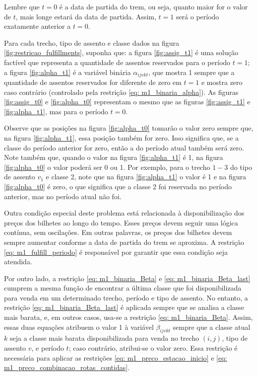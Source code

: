 Lembre que $t=0$ é a data de partida do trem, ou seja, quanto maior for o valor de $t$, mais longe estará da data de partida. Assim, $t=1$ será o período exatamente anterior a $t=0$.

Para cada trecho, tipo de assento e classe dados na figura \ref{fig:restricao_fulfillments}, suponha que: a figura \ref{fig:assig_t1} é uma solução factível que representa a quantidade de assentos reservados para o período $t=1$; a figura \ref{fig:alpha_t1}  é a variável binária $\alpha_{ijvkt}$, que mostra 1 sempre que a quantidade de assentos reservados for diferente de zero em $t=1$ e mostra zero caso contrário (controlado pela restrição \ref{eq: m1_binaria_alpha}). As figuras \ref{fig:assig_t0} e \ref{fig:alpha_t0} representam o mesmo que as figuras \ref{fig:assig_t1} e \ref{fig:alpha_t1}, mas para o período $t=0$.

Observe que as posições na figura \ref{fig:alpha_t0} tomarão o valor zero sempre que, na figura \ref{fig:alpha_t1}, essa posição também for zero. Isso significa que, se a classe do período anterior for zero, então a do período atual também será zero. Note também que, quando o valor na figura \ref{fig:alpha_t1} é 1, na figura \ref{fig:alpha_t0} o valor poderá ser 0 ou 1. Por exemplo, para o trecho $1-3$ do tipo de assento $v_1$ e classe 2, note que na figura \ref{fig:alpha_t1} o valor é 1 e na figura \ref{fig:alpha_t0} é zero, o que significa que a classe 2 foi reservada no período anterior, mas no período atual não foi.


Outra condição especial deste problema está relacionada à disponibilização dos preços dos bilhetes ao longo do tempo. Esses preços devem seguir uma lógica contínua, sem oscilações. Em outras palavras, os preços dos bilhetes devem sempre aumentar conforme a data de partida do trem se aproxima. A restrição \ref{eq: m1_fulfill_periodo} é responsável por garantir que essa condição seja atendida.

Por outro lado, a restrição \ref{eq: m1_binaria_Beta} e \ref{eq: m1_binaria_Beta_last} cumprem a mesma função de encontrar a última classe que foi disponibilizada para venda em um determinado trecho, período e tipo de assento. No entanto, a restrição \ref{eq: m1_binaria_Beta_last} é aplicada sempre que se analisa a classe mais barata, e, em outros casos, usa-se a restrição \ref{eq: m1_binaria_Beta}. Assim, essas duas equações atribuem o valor 1 à variável $\beta_{ijvkt}$ sempre que a classe atual $k$ seja a classe mais barata disponibilizada para venda no trecho $(i,j)$, tipo de assento $v$, e período $t$; caso contrário, atribui-se o valor zero. Essa restrição é necessária para aplicar as restrições \ref{eq: m1_preco_estacao_inicio} e \ref{eq: m1_preco_combinacao_rotas_contidas}.

